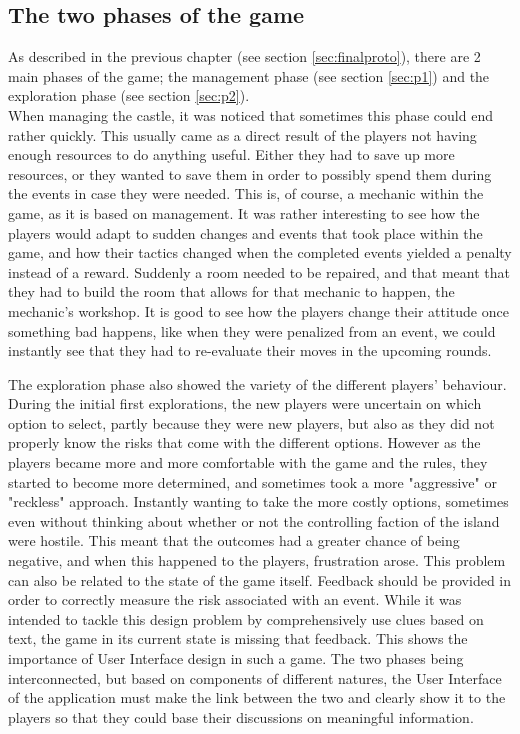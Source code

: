 \subsection{The two phases of the game}

As described in the previous chapter (see section \ref{sec:finalproto}), there are 2 main phases of the game; the management phase (see section \ref{sec:p1}) and the exploration phase (see section \ref{sec:p2}).\\When managing the castle, it was noticed that sometimes this phase could end rather quickly. This usually came as a direct result of the players not having enough resources to do anything useful. Either they had to save up more resources, or they wanted to save them in order to possibly spend them during the events in case they were needed. This is, of course, a mechanic within the game, as it is based on management. It was rather interesting to see how the players would adapt to sudden changes and events that took place within the game, and how their tactics changed when the completed events yielded a penalty instead of a reward. Suddenly a room needed to be repaired, and that meant that they had to build the room that allows for that mechanic to happen, the mechanic's workshop. It is good to see how the players change their attitude once something bad happens, like when they were penalized from an event, we could instantly see that they had to re-evaluate their moves in the upcoming rounds.

The exploration phase also showed the variety of the different players' behaviour. During the initial first explorations, the new players were uncertain on which option to select, partly because they were new players, but also as they did not properly know the risks that come with the different options. However as the players became more and more comfortable with the game and the rules, they started to become more determined, and sometimes took a more "aggressive" or "reckless" approach. Instantly wanting to take the more costly options, sometimes even without thinking about whether or not the controlling faction of the island were hostile. This meant that the outcomes had a greater chance of being negative, and when this happened to the players, frustration arose. This problem can also be related to the state of the game itself. Feedback should be provided in order to correctly measure the risk associated with an event. While it was intended to tackle this design problem by comprehensively use clues based on text, the game in its current state is missing that feedback. This shows the importance of User Interface design in such a game. The two phases being interconnected, but based on components of different natures, the User Interface of the application must make the link between the two and clearly show it to the players so that they could base their discussions on meaningful information.

